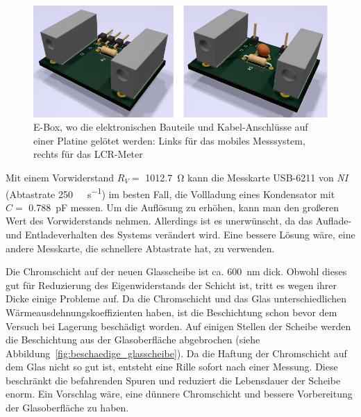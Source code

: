 \begin{figure}[htb]
    \centering
    \includegraphics[]{./images/ebox_ladekurve_lcr-meter.pdf}
    \caption{E-Box, wo die elektronischen Bauteile und Kabel-Anschlüsse auf einer Platine gelötet werden: Links für das mobiles Messsystem, rechts für das LCR-Meter}
    \label{fig:ebox_fuer_mobil_und_lcr_meter}
\end{figure}

Mit einem Vorwiderstand $R_V =$ \SI{1012.7}{\ohm} kann die Messkarte USB-6211 von \textit{NI} (Abtastrate \SI[per-mode=symbol]{250}{\kilo\sample\per\second}) im besten Fall, die Vollladung eines Kondensator mit $C =$ \SI{0.788}{\pico\farad} messen.
Um die Auflösung zu erhöhen, kann man den großeren Wert des Vorwiderstands nehmen.
Allerdings ist es unerwünscht, da das Auflade- und Entladeverhalten des Systems verändert wird.
Eine bessere Lösung wäre, eine andere Messkarte, die schnellere Abtastrate hat, zu verwenden.

Die Chromschicht auf der neuen Glasscheibe ist ca. \SI{600}{\nm} dick.
Obwohl dieses gut für Reduzierung des Eigenwiderstands der Schicht ist, tritt es wegen ihrer Dicke einige Probleme auf.
Da die Chromschicht und das Glas unterschiedlichen Wärmeausdehnungskoeffizienten haben, ist die Beschichtung schon bevor dem Versuch bei Lagerung beschädigt worden.
Auf einigen Stellen der Scheibe werden die Beschichtung aus der Glasoberfläche abgebrochen (siehe Abbildung~\ref{fig:beschaedige_glasscheibe}).
Da die Haftung der Chromschicht auf dem Glas nicht so gut ist, entsteht eine Rille sofort nach einer Messung.
Diese beschränkt die befahrenden Spuren und reduziert die Lebensdauer der Scheibe enorm.
Ein Vorschlag wäre, eine dünnere Chromschicht und bessere Vorbereitung der Glasoberfläche zu haben.

